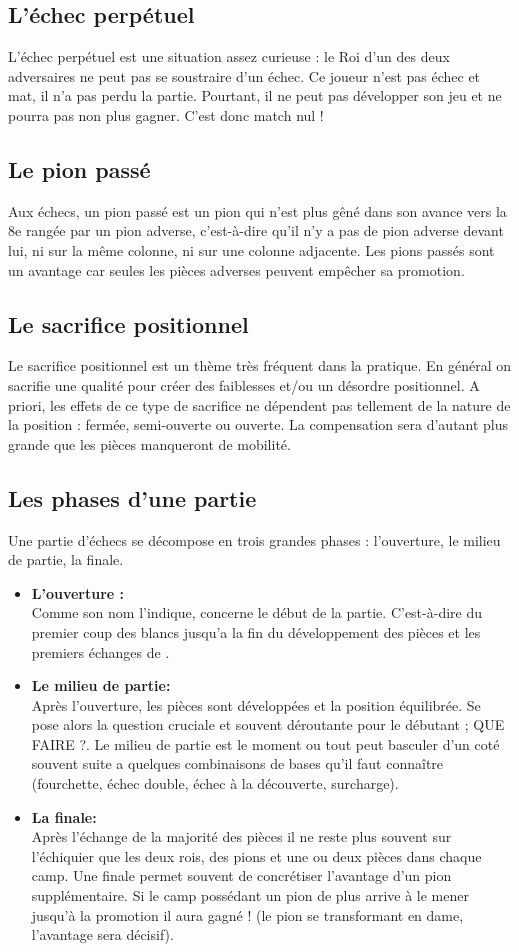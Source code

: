 \documentclass[12pt]{report}
\begin{document}
	\subsection{L’échec perpétuel}
		L’échec perpétuel est une situation assez curieuse : le Roi d’un des deux adversaires ne peut pas se soustraire d’un échec. Ce joueur n’est pas échec et mat, il n’a pas perdu la partie. Pourtant, il ne peut pas développer son jeu et ne pourra pas non plus gagner. C’est donc match nul !
		
	\subsection{Le pion passé}
		Aux échecs, un pion passé est un pion qui n'est plus gêné dans son avance vers la 8e rangée par un pion adverse, c'est-à-dire qu'il n'y a pas de pion adverse devant lui, ni sur la même colonne, ni sur une colonne adjacente. Les pions passés sont un avantage car seules les pièces adverses peuvent empêcher sa promotion.
	\subsection{Le sacrifice positionnel}	
		Le sacrifice positionnel est un
		thème très fréquent dans la pratique. En
		général on sacrifie une qualité pour créer des
		faiblesses et/ou un désordre positionnel. A
		priori, les effets de ce type de sacrifice ne
		dépendent pas tellement de la nature de la
		position : fermée, semi-ouverte ou ouverte. La
		compensation sera d’autant plus grande que
		les pièces manqueront de mobilité.
	\subsection{Les phases d'une partie}
		Une partie d'échecs se décompose en trois grandes phases : l'ouverture, le milieu de partie, la finale. 
		\begin{itemize}
			\item	\textbf{L'ouverture :}\\
			Comme son nom l'indique, concerne le début de la partie. C'est-à-dire du premier coup des blancs jusqu'a la fin du développement des pièces et les premiers échanges de .
			\item	\textbf{Le milieu de partie:}\\
			Après l'ouverture, les pièces sont développées et la position équilibrée. Se pose alors la question cruciale et souvent déroutante pour le débutant ; QUE FAIRE ?. Le milieu de partie est le moment ou tout peut basculer d'un coté souvent suite a quelques combinaisons de bases qu'il faut connaître (fourchette, échec double, échec à la découverte, surcharge).
			\item	\textbf{La finale:}\\ 
			Après l'échange de la majorité des pièces il ne reste plus souvent sur l'échiquier que les deux rois, des pions et une ou deux pièces dans chaque camp. Une finale permet souvent de concrétiser l'avantage d'un pion supplémentaire. Si le camp possédant un pion de plus arrive à le mener jusqu'à la promotion il aura gagné ! (le pion se transformant en dame, l'avantage sera décisif).
		\end{itemize}
	\newpage
\end{document}
